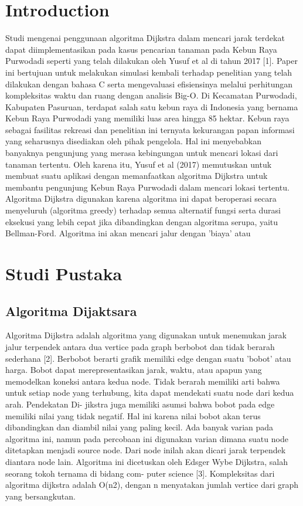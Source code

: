 \documentclass[conference]{IEEEtran}
\begin{document}
{\section{Introduction}
Studi mengenai penggunaan algoritma Dijkstra dalam mencari jarak terdekat dapat diimplementasikan pada kasus pencarian tanaman pada Kebun Raya Purwodadi seperti yang telah
dilakukan oleh Yusuf et al di tahun 2017 [1]. Paper ini bertujuan untuk melakukan simulasi kembali terhadap penelitian yang telah dilakukan dengan bahasa C serta mengevaluasi
efisiensinya melalui perhitungan kompleksitas waktu dan ruang dengan analisis Big-O. Di Kecamatan Purwodadi, Kabupaten Pasuruan, terdapat
salah satu kebun raya di Indonesia yang bernama Kebun Raya Purwodadi yang memiliki luas area hingga 85 hektar. Kebun raya sebagai fasilitas rekreasi dan penelitian ini ternyata
kekurangan papan informasi yang seharusnya disediakan oleh pihak pengelola. Hal ini menyebabkan banyaknya pengunjung
yang merasa kebingungan untuk mencari lokasi dari tanaman tertentu. Oleh karena itu, Yusuf et al (2017) memutuskan
untuk membuat suatu aplikasi dengan memanfaatkan algoritma Dijkstra untuk membantu pengunjung Kebun Raya Purwodadi dalam mencari lokasi tertentu.
Algoritma Dijkstra digunakan karena algoritma ini dapat beroperasi secara menyeluruh (algoritma greedy) terhadap
semua alternatif fungsi serta durasi eksekusi yang lebih cepat jika dibandingkan dengan algoritma serupa, yaitu Bellman-Ford. Algoritma ini akan mencari jalur dengan ’biaya’ atau
\section{Studi Pustaka}

\subsection{Algoritma Dijaktsara}
Algoritma Dijkstra adalah algoritma yang digunakan untuk 
menemukan jarak jalur terpendek antara dua vertice pada
graph berbobot dan tidak berarah sederhana [2]. Berbobot
berarti grafik memiliki edge dengan suatu ’bobot’ atau harga.
Bobot dapat merepresentasikan jarak, waktu, atau apapun
yang memodelkan koneksi antara kedua node. Tidak berarah
memiliki arti bahwa untuk setiap node yang terhubung, kita
dapat mendekati suatu node dari kedua arah. Pendekatan Di-
jikstra juga memiliki asumsi bahwa bobot pada edge memiliki
nilai yang tidak negatif. Hal ini karena nilai bobot akan
terus dibandingkan dan diambil nilai yang paling kecil. Ada
banyak varian pada algoritma ini, namun pada percobaan
ini digunakan varian dimana suatu node ditetapkan menjadi
source node. Dari node inilah akan dicari jarak terpendek
diantara node lain. Algoritma ini dicetuskan oleh Edsger
Wybe Dijkstra, salah seorang tokoh ternama di bidang com-
puter science [3]. Kompleksitas dari algoritma dijkstra adalah
O(n2), dengan n menyatakan jumlah vertice dari graph yang
bersangkutan.

}
\end{document}
